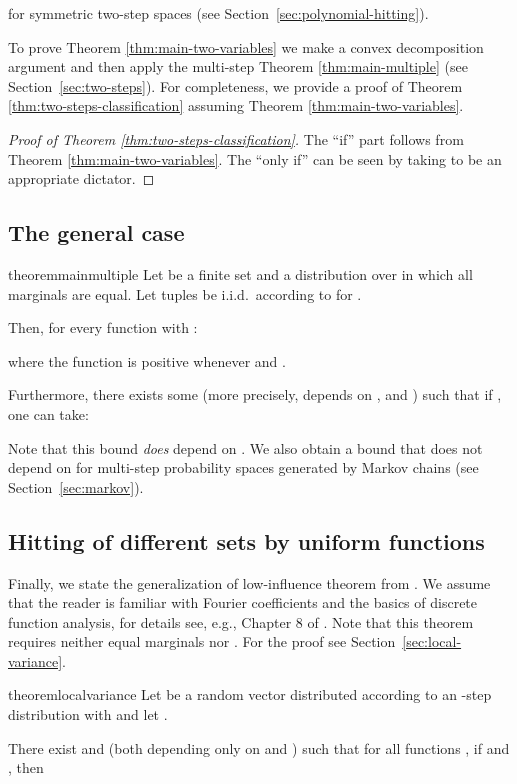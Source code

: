 \documentclass{daj}
\newcommand{\1}{\mathbbm{1}}
\theoremstyle{plain}
\theoremstyle{definition}
\begin{document}
for symmetric two-step spaces (see Section~\ref{sec:polynomial-hitting}).

To prove Theorem \ref{thm:main-two-variables} we make
a convex decomposition argument and then apply
the multi-step Theorem \ref{thm:main-multiple}
(see Section~\ref{sec:two-steps}).
For completeness, we provide a proof of 
Theorem \ref{thm:two-steps-classification} assuming Theorem
\ref{thm:main-two-variables}.
\begin{proof}[Proof of Theorem \ref{thm:two-steps-classification}]
The ``if'' part follows from Theorem \ref{thm:main-two-variables}.
The ``only if'' can be seen by taking  to be an appropriate dictator. 
\end{proof}

\subsection{The general case}

\begin{restatable}{theorem}{mainmultiple}
\label{thm:main-multiple}
Let  be a finite set and  a distribution over  in
which all marginals are equal.  Let tuples
 be i.i.d.~according to
 for .

Then, for every function 
with :

where the function  is positive whenever 
and .

Furthermore, there exists some 
(more precisely,  depends on 
,  and ) such that
if , one can take:

\end{restatable}

Note that this bound \emph{does} depend on .
We also obtain a bound that does not depend on 
for multi-step probability spaces generated by Markov chains
(see Section~\ref{sec:markov}).

\subsection{Hitting of different sets by uniform functions}

Finally, we state the generalization of low-influence theorem from
\cite{Mos10}. We assume that the reader is familiar with
Fourier coefficients  and the basics of discrete function 
analysis, for details see, e.g., Chapter 8 of \cite{Dol14}.
Note that this theorem requires neither equal marginals
nor .
For the proof see Section~\ref{sec:local-variance}.

\begin{restatable}{theorem}{localvariance}
\label{thm:local-variance}
Let  be a random vector distributed according
to an -step distribution  with  and
let . 

There exist
 and  (both depending only
on  and ) such that for all functions
,
if  and
, then

\end{restatable}
\end{document}
